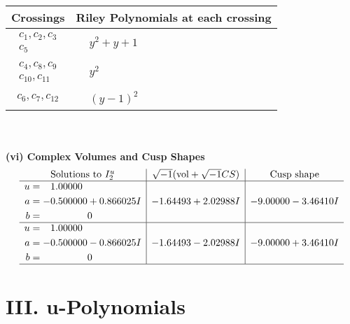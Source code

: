 \documentclass[1p]{elsarticle_modified}
\theoremstyle{definition}
\newcommand{\I}{\sqrt{-1}}
\begin{document}
\begin{tabular}{m{50pt}|m{274pt}}
Crossings & \hspace{64pt}Riley Polynomials at each crossing \\
\hline $$\begin{aligned}c_{1},c_{2},c_{3}\\c_{5}\end{aligned}$$&$\begin{aligned}
&y^2+y+1
\end{aligned}$\\
\hline $$\begin{aligned}c_{4},c_{8},c_{9}\\c_{10},c_{11}\end{aligned}$$&$\begin{aligned}
&y^2
\end{aligned}$\\
\hline $$\begin{aligned}c_{6},c_{7},c_{12}\end{aligned}$$&$\begin{aligned}
&(y-1)^2
\end{aligned}$\\
\hline
\end{tabular}\\~\\
\newpage\flushleft \textbf{(vi) Complex Volumes and Cusp Shapes}
$$\begin{array}{c|c|c}  
\text{Solutions to }I^u_{2}& \I (\text{vol} + \sqrt{-1}CS) & \text{Cusp shape}\\
 \hline 
\begin{aligned}
u &= \phantom{-}1.00000\phantom{ +0.000000I} \\
a &= -0.500000 + 0.866025 I \\
b &= \phantom{-0.000000 } 0\end{aligned}
 & -1.64493 + 2.02988 I & -9.00000 - 3.46410 I \\ \hline\begin{aligned}
u &= \phantom{-}1.00000\phantom{ +0.000000I} \\
a &= -0.500000 - 0.866025 I \\
b &= \phantom{-0.000000 } 0\end{aligned}
 & -1.64493 - 2.02988 I & -9.00000 + 3.46410 I\\
 \hline 
 \end{array}$$\newpage
\newpage\renewcommand{\arraystretch}{1}
\centering \section*{ III. u-Polynomials}
\end{document}
